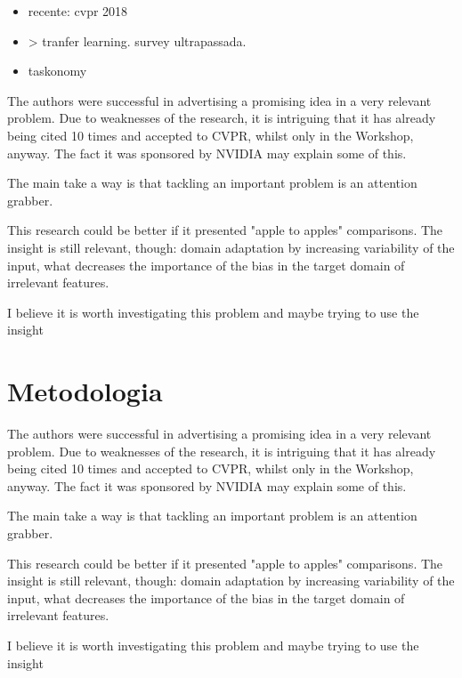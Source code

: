 \documentclass[
12pt, %
a4paper, %
onecolumn, %
]{article}
\begin{document}
\begin{itemize}


  \item recente: cvpr 2018  \item> tranfer learning. survey ultrapassada.
  \item taskonomy
\end{itemize}



The authors were successful in advertising a promising idea in a very relevant problem.  Due to weaknesses of the research, it is intriguing that it has already being cited 10 times and accepted to CVPR, whilst only in the Workshop, anyway. The fact it was sponsored by NVIDIA may explain some of this.

The main take a way is that tackling an important problem is an attention grabber. 

This research could be better if it presented "apple to apples" comparisons. The insight is still relevant, though: domain adaptation by increasing variability of the input, what decreases the importance of the bias in the target domain of irrelevant features.

I believe it is worth investigating this problem and maybe trying to use the insight


\section{Metodologia}

The authors were successful in advertising a promising idea in a very relevant problem.  Due to weaknesses of the research, it is intriguing that it has already being cited 10 times and accepted to CVPR, whilst only in the Workshop, anyway. The fact it was sponsored by NVIDIA may explain some of this.

The main take a way is that tackling an important problem is an attention grabber. 

This research could be better if it presented "apple to apples" comparisons. The insight is still relevant, though: domain adaptation by increasing variability of the input, what decreases the importance of the bias in the target domain of irrelevant features.

I believe it is worth investigating this problem and maybe trying to use the insight

\end{document}
